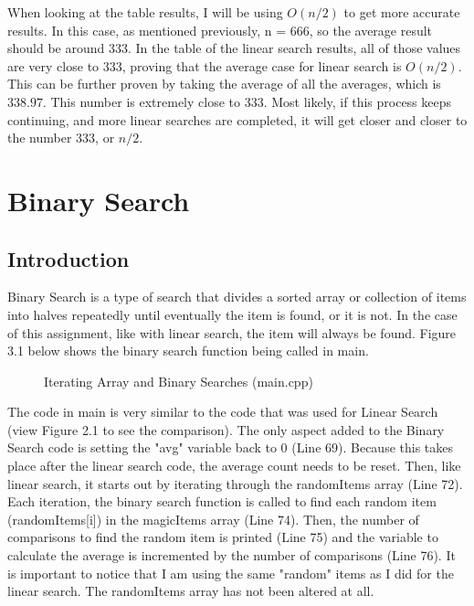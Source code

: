 \documentclass[letterpaper, 10pt]{article}
\begin{document}
\vspace{1em}

\noindent
When looking at the table results, I will be using $O(n / 2)$ to get more accurate results. In this case, as mentioned previously, n = 666, so the average result should be around 333. In the table of the linear search results, all of those values are very close to 333, proving that the average case for linear search is $O(n / 2)$. This can be further proven by taking the average of all the averages, which is $338.97$. This number is extremely close to 333. Most likely, if this process keeps continuing, and more linear searches are completed, it will get closer and closer to the number 333, or $n/2$.

\section{Binary Search}
\setcounter{figure}{0} %

\subsection{Introduction}
\noindent
Binary Search is a type of search that divides a sorted array or collection of items into halves repeatedly until eventually the item is found, or it is not. In the case of this assignment, like with linear search, the item will always be found. Figure 3.1 below shows the binary search function being called in main.

\begin{figure}[H]
  \centering
   
  \caption{Iterating Array and Binary Searches (main.cpp)}
  \label{fig:figure3.1}
\end{figure}

\noindent
The code in main is very similar to the code that was used for Linear Search (view Figure 2.1 to see the comparison). The only aspect added to the Binary Search code is setting the "avg" variable back to 0 (Line 69). Because this takes place after the linear search code, the average count needs to be reset. Then, like linear search, it starts out by iterating through the randomItems array (Line 72). Each iteration, the binary search function is called to find each random item (randomItems[i]) in the magicItems array (Line 74). Then, the number of comparisons to find the random item is printed (Line 75) and the variable to calculate the average is incremented by the number of comparisons (Line 76). It is important to notice that I am using the same "random" items as I did for the linear search. The randomItems array has not been altered at all.
\end{document}
